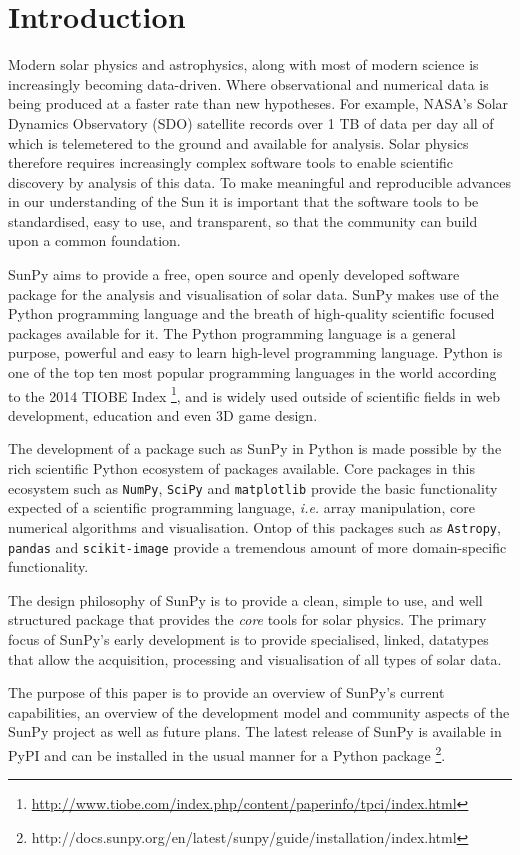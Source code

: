\section{Introduction}
Modern solar physics and astrophysics, along with most of modern science is 
increasingly becoming data-driven. Where observational and numerical data is 
being produced at a faster rate than new hypotheses. For example, NASA's Solar 
Dynamics Observatory (SDO) satellite records over 1 TB of data per day all of 
which is telemetered to the ground and available for analysis.
Solar physics therefore requires increasingly complex software tools to enable 
scientific discovery by analysis of this data. To make meaningful and 
reproducible advances in our understanding of the Sun it is important that the 
software tools to be standardised, easy to use, and transparent, so that the 
community can build upon a common foundation.

SunPy aims to provide a free, open source and openly developed software package 
for the analysis and visualisation of solar data. SunPy makes use of the Python 
programming language and the breath of high-quality scientific focused packages 
available for it. The Python programming language is a general purpose, 
powerful and easy to learn high-level programming language. Python is one of 
the top ten most popular programming languages in the world according to the 
2014 TIOBE Index 
\footnote{\url{http://www.tiobe.com/index.php/content/paperinfo/tpci/index.html}},
 and is widely used outside of scientific fields in web development, education 
and even 3D game design.

The development of a package such as SunPy in Python is made possible by the 
rich scientific Python ecosystem of packages available. Core packages in this 
ecosystem such as \texttt{NumPy}, \texttt{SciPy} and \texttt{matplotlib} 
provide the basic functionality expected of a scientific programming language, 
\textit{i.e.} array manipulation, core numerical algorithms and visualisation. 
Ontop of this packages such as \texttt{Astropy}, \texttt{pandas} and 
\texttt{scikit-image} provide a tremendous amount of more domain-specific 
functionality.

The design philosophy of SunPy is to provide a clean, simple to use, and well 
structured package that provides the \textit{core} tools for solar physics. The 
primary focus of SunPy's early development is to provide specialised, linked, 
datatypes that allow the acquisition, processing and visualisation of all types 
of solar data.

The purpose of this paper is to provide an overview of SunPy's current 
capabilities, an overview of the development model and community aspects of the 
SunPy project as well as future plans. The latest release of SunPy is available 
in PyPI and can be installed in the usual manner for a Python package
\footnote{http://docs.sunpy.org/en/latest/sunpy/guide/installation/index.html}.